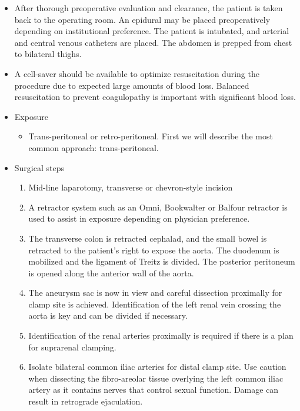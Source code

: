 \documentclass[
]{book}
\providecommand{\tightlist}{%
  \setlength{\itemsep}{0pt}\setlength{\parskip}{0pt}}
\begin{document}
\begin{itemize}
\item
  After thorough preoperative evaluation and clearance, the patient is
  taken back to the operating room. An epidural may be placed
  preoperatively depending on institutional preference. The patient is
  intubated, and arterial and central venous catheters are placed. The
  abdomen is prepped from chest to bilateral thighs.
\item
  A cell-saver should be available to optimize resuscitation during
  the procedure due to expected large amounts of blood loss. Balanced
  resuscitation to prevent coagulopathy is important with significant
  blood loss.
\item
  Exposure

  \begin{itemize}
  \tightlist
  \item
    Trans-peritoneal or retro-peritoneal. First we will describe the
    most common approach: trans-peritoneal.
  \end{itemize}
\item
  Surgical steps

  \begin{enumerate}
  \def\labelenumi{\arabic{enumi}.}
  \item
    Mid-line laparotomy, transverse or chevron-style incision
  \item
    A retractor system such as an Omni, Bookwalter or Balfour
    retractor is used to assist in exposure depending on physician
    preference.
  \item
    The transverse colon is retracted cephalad, and the small bowel
    is retracted to the patient's right to expose the aorta. The
    duodenum is mobilized and the ligament of Treitz is divided. The
    posterior peritoneum is opened along the anterior wall of the
    aorta.
  \item
    The aneurysm sac is now in view and careful dissection
    proximally for clamp site is achieved. Identification of the
    left renal vein crossing the aorta is key and can be divided if
    necessary.
  \item
    Identification of the renal arteries proximally is required if
    there is a plan for suprarenal clamping.
  \item
    Isolate bilateral common iliac arteries for distal clamp site.
    Use caution when dissecting the fibro-areolar tissue overlying
    the left common iliac artery as it contains nerves that control
    sexual function. Damage can result in retrograde ejaculation.


\end{enumerate}
\end{itemize}
\end{document}
